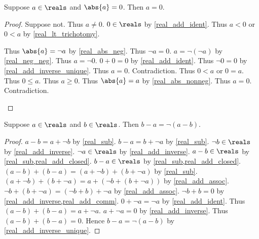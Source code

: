\begin{theorem}\label{real_abs_eq_zero}
    Suppose $a\in\reals$ and $\abs{a} = 0$.
    Then $a = 0$.
\end{theorem}
\begin{proof}
    Suppose not.
    Thus $a \neq 0$.
    $0\in\reals$ by \cref{real_add_ident}.
    Thus $a < 0$ or $0 < a$ by \cref{real_lt_trichotomy}.
    \begin{byCase}
        Thus $\abs{a} = \neg{a}$ by \cref{real_abs_neg}.
        Thus $\neg{a} = 0$.
        $a = \neg{(\neg{a})}$ by \cref{real_neg_neg}.
        Thus $a = \neg{0}$.
        $0 + 0 = 0$ by \cref{real_add_ident}.
        Thus $\neg{0} = 0$ by \cref{real_add_inverse_unique}.
        Thus $a = 0$.
        Contradiction.
        Thus $0 < a$ or $0 = a$.
        Thus $0 \leq a$.
        Thus $a \geq 0$.
        Thus $\abs{a} = a$ by \cref{real_abs_nonneg}.
        Thus $a = 0$.
        Contradiction.
    \end{byCase}
\end{proof}

\begin{lemma}\label{real_sub_swap_neg}
    Suppose $a\in\reals$ and $b\in\reals$.
    Then $b - a = \neg{(a - b)}$.
\end{lemma}
\begin{proof}
    $a - b = a + \neg{b}$ by \cref{real_sub}.
    $b - a = b + \neg{a}$ by \cref{real_sub}.
    $\neg{b}\in\reals$ by \cref{real_add_inverse}.
    $\neg{a}\in\reals$ by \cref{real_add_inverse}.
    $a - b\in\reals$ by \cref{real_sub,real_add_closed}.
    $b - a\in\reals$ by \cref{real_sub,real_add_closed}.
    $(a - b) + (b - a) = (a + \neg{b}) + (b + \neg{a})$ by \cref{real_sub}.
    $(a + \neg{b}) + (b + \neg{a}) = a + (\neg{b} + (b + \neg{a}))$ by \cref{real_add_assoc}.
    $\neg{b} + (b + \neg{a}) = (\neg{b} + b) + \neg{a}$ by \cref{real_add_assoc}.
    $\neg{b} + b = 0$ by \cref{real_add_inverse,real_add_comm}.
    $0 + \neg{a} = \neg{a}$ by \cref{real_add_ident}.
    Thus $(a - b) + (b - a) = a + \neg{a}$.
    $a + \neg{a} = 0$ by \cref{real_add_inverse}.
    Thus $(a - b) + (b - a) = 0$.
    Hence $b - a = \neg{(a - b)}$ by \cref{real_add_inverse_unique}.
\end{proof}

